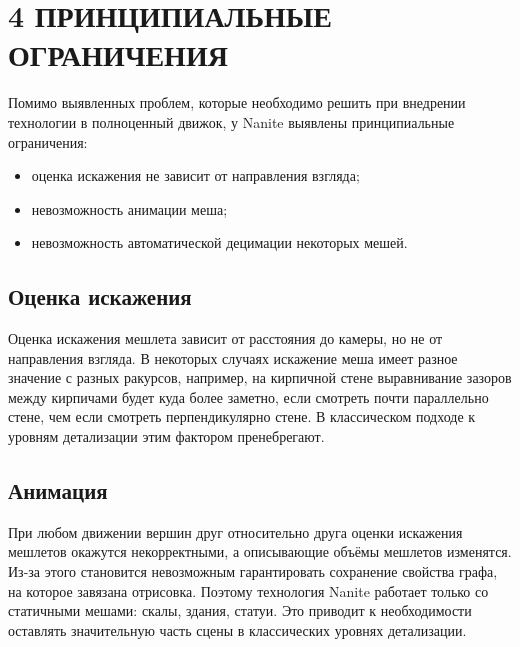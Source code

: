 \clearpage
\section{4 ПРИНЦИПИАЛЬНЫЕ ОГРАНИЧЕНИЯ}
Помимо выявленных проблем, которые необходимо решить при внедрении технологии в полноценный движок, у Nanite выявлены принципиальные ограничения:
\begin{itemize}
    \item оценка искажения не зависит от направления взгляда;
    \item невозможность анимации меша;
    \item невозможность автоматической децимации некоторых мешей.
\end{itemize}

\subsection*{Оценка искажения}
Оценка искажения мешлета зависит от расстояния до камеры, но не от направления взгляда.
В некоторых случаях искажение меша имеет разное значение с разных ракурсов, например, на кирпичной стене выравнивание зазоров между кирпичами будет куда более заметно, если смотреть почти параллельно стене, чем если смотреть перпендикулярно стене.
В классическом подходе к уровням детализации этим фактором пренебрегают.

\subsection*{Анимация}
При любом движении вершин друг относительно друга оценки искажения мешлетов окажутся некорректными, а описывающие объёмы мешлетов изменятся.
Из-за этого становится невозможным гарантировать сохранение свойства графа, на которое завязана отрисовка.
Поэтому технология Nanite работает только со статичными мешами: скалы, здания, статуи.
Это приводит к необходимости оставлять значительную часть сцены в классических уровнях детализации.

